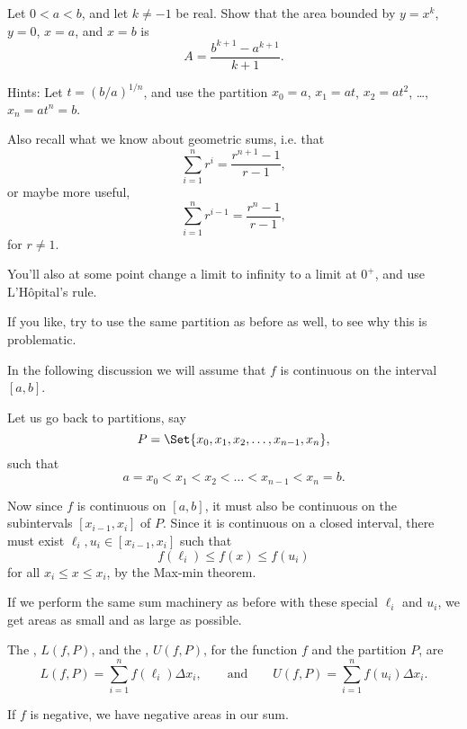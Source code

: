 \begin{exercise}
	Let $0 < a < b$, and let $k \neq -1$ be real. Show that the area bounded by $y = x^k$, $y = 0$, $x = a$, and $x = b$ is
	\[
		A = \frac{b^{k + 1} - a^{k + 1}}{k + 1}.
	\]

	\noindent
	Hints: Let $t = (b/a)^{1/n}$, and use the partition $x_0 = a$, $x_1 = a t$, $x_2 = a t^2$, \ldots, $x_n = a t^n = b$.

	Also recall what we know about geometric sums, i.e. that
	\[
		\sum_{i = 1}^n r^i = \frac{r^{n + 1} - 1}{r - 1},
	\]
	or maybe more useful,
	\[
		\sum_{i = 1}^n r^{i - 1} = \frac{r^n - 1}{r - 1},
	\]
	for $r \neq 1$.

	You'll also at some point change a limit to infinity to a limit at $0^+$, and use L'H\^{o}pital's rule.

	If you like, try to use the same partition as before as well, to see why this is problematic.
\end{exercise}


In the following discussion we will assume that $f$ is continuous on the interval $[a, b]$.

Let us go back to partitions, say
\[
	P = \Set{x_0, x_1, x_2, \ldots, x_{n - 1}, x_n},
\]
such that
\[
	a = x_0 < x_1 < x_2 < \ldots < x_{n - 1} < x_n = b.
\]

\noindent
Now since $f$ is continuous on $[a, b]$, it must also be continuous on the subintervals $[x_{i - 1}, x_i]$ of $P$. Since it is continuous on a closed interval, there must exist $\ell_i, u_i \in [x_{i - 1}, x_i]$ such that
\[
	f(\ell_i) \leq f(x) \leq f(u_i)
\]
for all $x_i \leq x \leq x_i$, by the Max-min theorem.

If we perform the same sum machinery as before with these special $\ell_i$ and $u_i$, we get areas as small and as large as possible.

\begin{definition}
	The , $L(f, P)$, and the , $U(f, P)$, for the function $f$ and the partition $P$, are
	\[
		L(f, P) = \sum_{i = 1}^n f(\ell_i) \Delta x_i, \qquad \text{and} \qquad U(f, P) = \sum_{i = 1}^n f(u_i) \Delta x_i.
	\]
\end{definition}

\begin{remark}
	If $f$ is negative, we have negative areas in our sum.
\end{remark}

